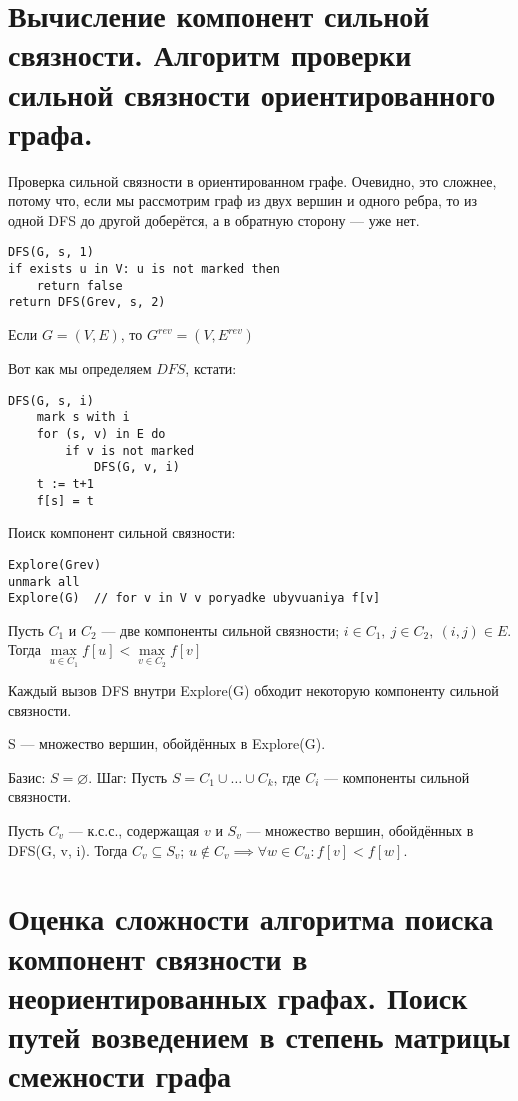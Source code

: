 \documentclass[a4paper,12pt]{article}
\begin{document}
\newpage
\section{Вычисление компонент сильной связности. Алгоритм проверки сильной связности ориентированного графа.}

Проверка сильной связности в ориентированном графе. Очевидно, это сложнее, потому что, если мы рассмотрим граф из двух вершин и одного ребра, то из одной DFS до другой доберётся, а в обратную сторону --- уже нет.

\begin{lstlisting}
DFS(G, s, 1)
if exists u in V: u is not marked then
    return false
return DFS(Grev, s, 2)
\end{lstlisting}

Если $G = (V, E)$, то $G^{rev} = (V, E^{rev})$

Вот как мы определяем $DFS$, кстати:

\begin{lstlisting}
DFS(G, s, i)
    mark s with i
    for (s, v) in E do
        if v is not marked
            DFS(G, v, i)
    t := t+1
    f[s] = t
\end{lstlisting}

Поиск компонент сильной связности:

\begin{lstlisting}
Explore(Grev)
unmark all
Explore(G)  // for v in V v poryadke ubyvuaniya f[v]
\end{lstlisting}

Пусть $C_1$ и $C_2$ --- две компоненты сильной связности; $i\in C_1,\ j\in C_2,\ (i,j)\in E$. Тогда $\max\limits_{u\in C_1} f[u] < \max\limits_{v\in C_2} f[v]$

Каждый вызов DFS внутри Explore(G) обходит некоторую компоненту сильной связности.

S --- множество вершин, обойдённых в Explore(G).

Базис: $S = \varnothing$.
Шаг: Пусть $S = C_1 \cup\ldots\cup C_k$, где $C_i$ --- компоненты сильной связности.

Пусть $C_v$ --- к.с.с., содержащая $v$ и $S_v$ --- множество вершин, обойдённых в DFS(G, v, i). Тогда $C_v \subseteq S_v$; $u\not\in C_v \implies \forall w \in C_u: f[v] < f[w]$.
\newpage
\section{Оценка сложности алгоритма поиска компонент связности в неориентированных графах. Поиск путей возведением в степень матрицы смежности графа}
\end{document}
